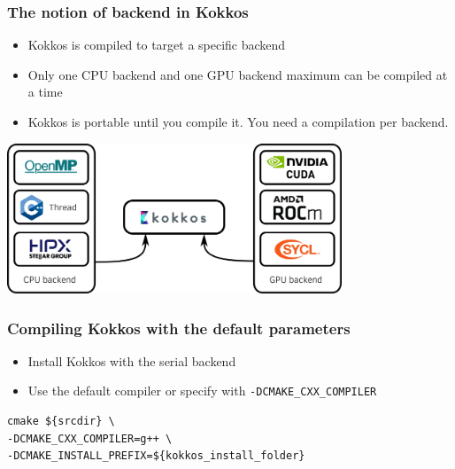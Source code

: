 \documentclass[aspectratio=169]{beamer}
\begin{document}
\begin{frame}
    \frametitle{The notion of backend in Kokkos} 
    \begin{itemize}
        \item Kokkos is compiled to target a specific backend
        \item Only one CPU backend and one GPU backend maximum can be compiled at a time
        \item Kokkos is portable until you compile it. You need a compilation per backend.
    \end{itemize}

    \hspace{1cm}

    \centering
    \includegraphics[width=0.75\textwidth]{../../images/kokkos_backend.png}

\end{frame}


\begin{frame}[fragile]
    \frametitle{Compiling Kokkos with the default parameters} 

\begin{itemize}
    \item Install Kokkos with the serial backend
    \item Use the default compiler or specify with \texttt{-DCMAKE\_CXX\_COMPILER}
\end{itemize}

\begin{verbatim}
cmake ${srcdir} \
-DCMAKE_CXX_COMPILER=g++ \
-DCMAKE_INSTALL_PREFIX=${kokkos_install_folder}
\end{verbatim}

\end{frame}

\end{document}
